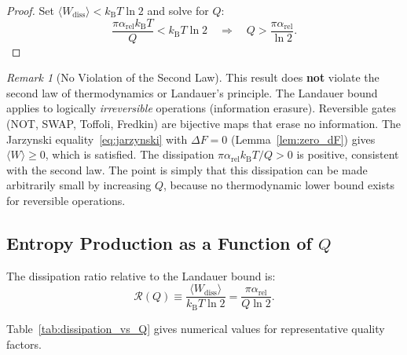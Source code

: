 \documentclass[11pt,twocolumn]{article}
\theoremstyle{definition}
\theoremstyle{remark}
\newtheorem{remark}[theorem]{Remark}
\newcommand{\kB}{k_{\mathrm{B}}}
\begin{document}
\begin{proof}
Set $\langle W_{\mathrm{diss}}\rangle < \kB T\ln 2$ and solve for $Q$:
\begin{equation}
\frac{\pi\alpha_{\mathrm{rel}}\kB T}{Q} < \kB T\ln 2
\quad\Rightarrow\quad
Q > \frac{\pi\alpha_{\mathrm{rel}}}{\ln 2}.
\end{equation}
\end{proof}

\begin{remark}[No Violation of the Second Law]
This result does \textbf{not} violate the second law of thermodynamics
or Landauer's principle. The Landauer bound applies to logically
\emph{irreversible} operations (information erasure). Reversible gates
(NOT, SWAP, Toffoli, Fredkin) are bijective maps that erase no
information. The Jarzynski equality~\eqref{eq:jarzynski} with $\Delta F
= 0$ (Lemma~\ref{lem:zero_dF}) gives $\langle W\rangle \geq 0$, which
is satisfied. The dissipation $\pi\alpha_{\mathrm{rel}}\kB T/Q > 0$ is
positive, consistent with the second law. The point is simply that this
dissipation can be made arbitrarily small by increasing $Q$, because no
thermodynamic lower bound exists for reversible operations.
\end{remark}

\subsection{Entropy Production as a Function of $Q$}\label{sec:entropy_vs_Q}

The dissipation ratio relative to the Landauer bound is:
\begin{equation}
\mathcal{R}(Q) \equiv \frac{\langle W_{\mathrm{diss}}\rangle}{\kB T\ln 2}
= \frac{\pi\alpha_{\mathrm{rel}}}{Q\ln 2}.
\label{eq:dissipation_ratio}
\end{equation}

Table~\ref{tab:dissipation_vs_Q} gives numerical values for
representative quality factors.
\end{document}
